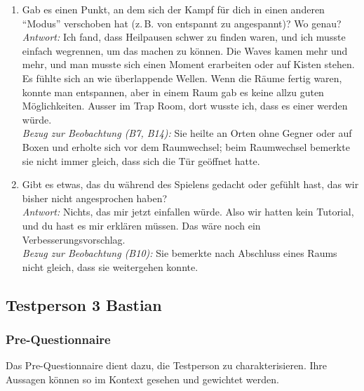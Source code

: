 \documentclass[../Main.tex]{subfiles}
\begin{document}
\begin{enumerate}[label=\textbf{I\arabic*}, leftmargin=1.5cm, itemsep=1em]
\item Gab es einen Punkt, an dem sich der Kampf für dich in einen anderen \enquote{Modus} verschoben hat (z.\,B. von entspannt zu angespannt)? Wo genau? \\
    \textit{Antwort:} Ich fand, dass Heilpausen schwer zu finden waren, und ich musste einfach wegrennen, um das machen zu können. Die Waves kamen mehr und mehr, und man musste sich einen Moment erarbeiten oder auf Kisten stehen. Es fühlte sich an wie überlappende Wellen. Wenn die Räume fertig waren, konnte man entspannen, aber in einem Raum gab es keine allzu guten Möglichkeiten. Ausser im Trap Room, dort wusste ich, dass es einer werden würde. \\
    \textit{Bezug zur Beobachtung (B7, B14):} Sie heilte an Orten ohne Gegner oder auf Boxen und erholte sich vor dem Raumwechsel; beim Raumwechsel bemerkte sie nicht immer gleich, dass sich die Tür geöffnet hatte.

\item Gibt es etwas, das du während des Spielens gedacht oder gefühlt hast, das wir bisher nicht angesprochen haben? \\
    \textit{Antwort:} Nichts, das mir jetzt einfallen würde. Also wir hatten kein Tutorial, und du hast es mir erklären müssen. Das wäre noch ein Verbesserungsvorschlag. \\
    \textit{Bezug zur Beobachtung (B10):} Sie bemerkte nach Abschluss eines Raums nicht gleich, dass sie weitergehen konnte.
\end{enumerate}

\subsection{Testperson 3 Bastian}

\subsubsection{Pre-Questionnaire}

Das Pre-Questionnaire dient dazu, die Testperson zu charakterisieren. Ihre Aussagen können so im Kontext gesehen und gewichtet werden.
\end{document}
